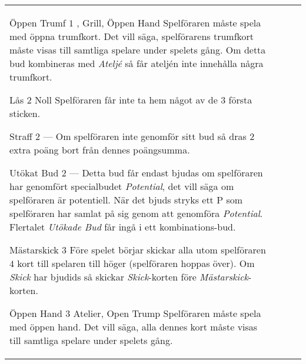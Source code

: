 \begin{table}
\begin{center}
\begin{tabularx}{\textwidth}{lcp{3cm}|X}
			\specialBidItem%
			{Öppen Trumf}
			{$1$}
			{\nonTrump, Grill, Öppen Hand}
			{%
				Spelföraren måste spela med öppna trumfkort. Det vill säga, spelförarens trumfkort måste visas till samtliga spelare under spelets gång. Om detta bud kombineras med \emph{Ateljé} så får ateljén inte innehålla några trumfkort.
			}

			\specialBidItem%
			{Lås}
			{$2$}
			{Noll}
			{%
				Spelföraren får inte ta hem något av de $3$ första sticken.
			}

			\specialBidItem%
			{Straff}
			{$2$}
			{---}
			{%
				Om spelföraren inte genomför sitt bud så dras $2$ extra poäng bort från dennes poängsumma.
			}

			\specialBidItem%
			{Utökat Bud}
			{$2$}
			{---}
			{%
				Detta bud får endast bjudas om spelföraren har genomfört specialbudet \emph{Potential}, det vill säga om spelföraren är potentiell. När det bjuds stryks ett P som spelföraren har samlat på sig genom att genomföra \emph{Potential}. Flertalet \emph{Utökade Bud} får ingå i ett kombinations-bud.
			}

			\specialBidItem%
			{Mästarskick}
			{$3$}
			{\nonTrump}
			{%
				Före spelet börjar skickar alla utom spelföraren $4$ kort till spelaren till höger (spelföraren hoppas över). Om \emph{Skick} har bjudids så skickar \emph{Skick}-korten före \emph{Mästarskick}-korten.
			}

			\specialBidItem%
			{Öppen Hand}
			{$3$}
			{Atelier, Open Trump}
			{%
				Spelföraren måste spela med öppen hand. Det vill säga, alla dennes kort måste visas till samtliga spelare under spelets gång.
			}
		\end{tabularx}
	\end{center}
\end{table}
